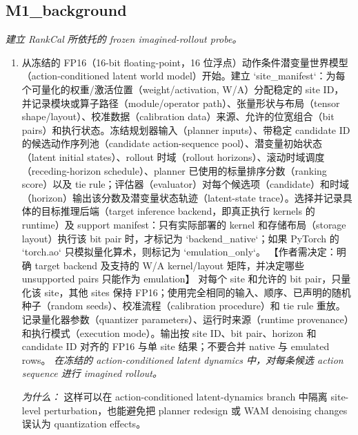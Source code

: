 \documentclass[10pt,a4paper]{article}
\begin{document}
\subsection*{M1\_background}
\emph{建立 RankCal 所依托的 frozen imagined-rollout probe。}
\begin{enumerate}[leftmargin=*,start=1]
  \item 从冻结的 FP16（16-bit floating-point，16 位浮点）动作条件潜变量世界模型（action-conditioned latent world model）开始。建立 `site\_manifest`：为每个可量化的权重/激活位置（weight/activation, W/A）分配稳定的 site ID，并记录模块或算子路径（module/operator path）、张量形状与布局（tensor shape/layout）、校准数据（calibration data）来源、允许的位宽组合（bit pairs）和执行状态。冻结规划器输入（planner inputs）、带稳定 candidate ID 的候选动作序列池（candidate action-sequence pool）、潜变量初始状态（latent initial states）、rollout 时域（rollout horizons）、滚动时域调度（receding-horizon schedule）、planner 已使用的标量排序分数（ranking score）以及 tie rule；评估器（evaluator）对每个候选项（candidate）和时域（horizon）输出该分数及潜变量状态轨迹（latent-state trace）。选择并记录具体的目标推理后端（target inference backend，即真正执行 kernels 的 runtime）及 support manifest：只有实际部署的 kernel 和存储布局（storage layout）执行该 bit pair 时，才标记为 `backend\_native`；如果 PyTorch 的 `torch.ao` 只模拟量化算术，则标记为 `emulation\_only`。 【作者需决定：明确 target backend 及支持的 W/A kernel/layout 矩阵，并决定哪些 unsupported pairs 只能作为 emulation】 对每个 site 和允许的 bit pair，只量化该 site，其他 sites 保持 FP16；使用完全相同的输入、顺序、已声明的随机种子（random seeds）、校准流程（calibration procedure）和 tie rule 重放。记录量化器参数（quantizer parameters）、运行时来源（runtime provenance）和执行模式（execution mode）。输出按 site ID、bit pair、horizon 和 candidate ID 对齐的 FP16 与单 site 结果；不要合并 native 与 emulated rows。
\noindent\emph{在冻结的 action-conditioned latent dynamics 中，对每条候选 action sequence 进行 imagined rollout。}
\par{}
\par\emph{为什么：} 这样可以在 action-conditioned latent-dynamics branch 中隔离 site-level perturbation，也能避免把 planner redesign 或 WAM denoising changes 误认为 quantization effects。
\end{enumerate}
\end{document}
